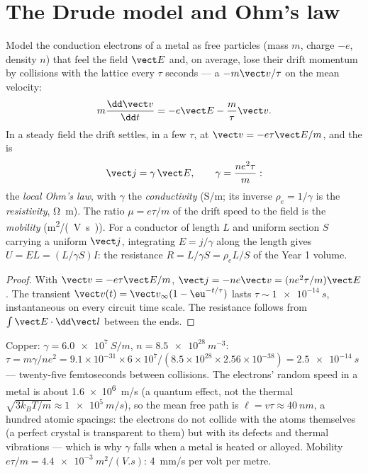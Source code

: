 \section{The Drude model and Ohm's law}

\begin{proposition}\label{prop:b2:charges-currents-conduction:drude}
Model the conduction electrons of a metal as free particles (mass $m$,
charge $-e$, density $n$) that feel the field $\vect E$ and, on average,
lose their drift momentum by collisions with the lattice every $\tau$
seconds --- a  $-m\vect v/\tau$ on the mean velocity:
\[
m\frac{\dd\vect v}{\dd t} = -e\vect E - \frac m\tau\vect v .
\]
In a steady field the drift settles, in a few $\tau$, at $\vect v = -e\tau
\vect E/m$, and the  is
\[
\vect j = \gamma\,\vect E , \qquad \gamma = \frac{ne^2\tau}{m} :
\]
the \emph{local Ohm's law}, with $\gamma$ the \emph{conductivity}
(\unit{S/m}; its inverse $\rho_e = 1/\gamma$ is the \emph{resistivity},
\unit{\ohm.m}). The ratio $\mu = e\tau/m$ of the drift speed to the field is
the \emph{mobility} (\unit{m^2/(V.s)}). For a conductor of length $L$ and
uniform section $S$ carrying a uniform $\vect j$, integrating $E = j/\gamma$
along the length gives $U = EL = (L/\gamma S)I$: the resistance $R = L/\gamma S
= \rho_eL/S$ of the Year 1 volume.
\end{proposition}

\begin{proof}
With $\vect v = -e\tau\vect E/m$, $\vect j = -ne\vect v = (ne^2\tau/m)\vect E$. The
transient $\vect v(t) = \vect v_\infty(1 - \eu^{-t/\tau})$ lasts $\tau \sim
\qty{1e-14}{s}$, instantaneous on every circuit time scale. The resistance
follows from $\int\vect E\cdot\dd\vect l$ between the ends.
\end{proof}

\begin{example}\label{ex:b2:charges-currents-conduction:copper}
Copper: $\gamma = \qty{6.0e7}{S/m}$, $n = \qty{8.5e28}{m^{-3}}$: $\tau = m\gamma/ne^2 =
9.1 \times 10^{-31} \times 6 \times 10^7/(8.5 \times 10^{28} \times 2.56 \times 10^{-38}) = \qty{2.5e-14}{s}$
--- twenty-five femtoseconds between collisions. The electrons' random
speed in a metal is about \qty{1.6e6}{m/s} (a quantum effect, not the
thermal $\sqrt{3k_BT/m} \approx \qty{1e5}{m/s}$), so the mean free path is $\ell
= v\tau \approx \qty{40}{nm}$, a hundred atomic spacings: the electrons do not
collide with the atoms themselves (a perfect crystal is transparent to
them) but with its defects and thermal vibrations --- which is why
$\gamma$ falls when a metal is heated or alloyed. Mobility $e\tau/m =
\qty{4.4e-3}{m^2/(V.s)}$: \qty{4}{mm/s} per volt per metre.
\end{example}

